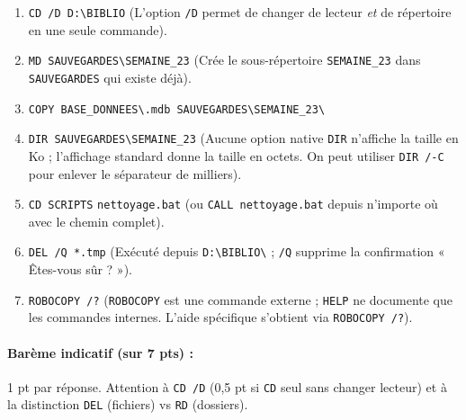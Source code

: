 \documentclass[11pt]{article}
\begin{document}
\begin{corrige}
\begin{enumerate}
    \item \texttt{CD /D D:\textbackslash BIBLIO} \quad (L'option \texttt{/D} permet de changer de lecteur \emph{et} de répertoire en une seule commande).
    \item \texttt{MD SAUVEGARDES\textbackslash SEMAINE\_23} \quad (Crée le sous-répertoire \texttt{SEMAINE\_23} dans \texttt{SAUVEGARDES} qui existe déjà).
    \item \texttt{COPY BASE\_DONNEES\textbackslash *.mdb SAUVEGARDES\textbackslash SEMAINE\_23\textbackslash}
    \item \texttt{DIR SAUVEGARDES\textbackslash SEMAINE\_23} \quad (Aucune option native \texttt{DIR} n'affiche la taille en Ko ; l'affichage standard donne la taille en octets. On peut utiliser \texttt{DIR /-C} pour enlever le séparateur de milliers).
    \item \texttt{CD SCRIPTS} \newline \texttt{nettoyage.bat} \quad (ou \texttt{CALL nettoyage.bat} depuis n'importe où avec le chemin complet).
    \item \texttt{DEL /Q *.tmp} \quad (Exécuté depuis \texttt{D:\textbackslash BIBLIO\textbackslash} ; \texttt{/Q} supprime la confirmation « Êtes-vous sûr ? »).
    \item \texttt{ROBOCOPY /?} \quad (\texttt{ROBOCOPY} est une commande externe ; \texttt{HELP} ne documente que les commandes internes. L'aide spécifique s'obtient via \texttt{ROBOCOPY /?}).
\end{enumerate}
\paragraph{Barème indicatif (sur 7 pts) :} 1 pt par réponse. Attention à \texttt{CD /D} (0,5 pt si \texttt{CD} seul sans changer lecteur) et à la distinction \texttt{DEL} (fichiers) vs \texttt{RD} (dossiers).
\end{corrige}
\end{document}
